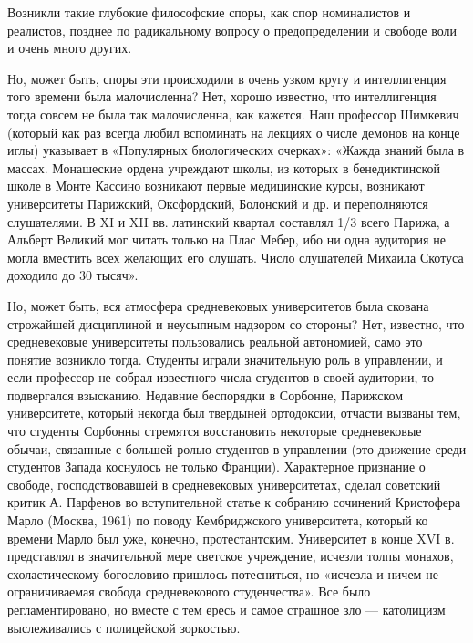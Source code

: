 Возникли такие глубокие философские споры, как спор номиналистов и
реалистов, позднее по радикальному вопросу о предопределении и свободе воли и
очень много других.

Но, может быть, споры эти происходили в очень узком кругу и интеллигенция
того времени была малочисленна? Нет, хорошо известно, что интеллигенция
тогда совсем не была так малочисленна, как кажется. Наш профессор Шимкевич
(который как раз всегда любил вспоминать на лекциях о числе демонов на
конце иглы) указывает в «Популярных биологических очерках»: «Жажда знаний
была в массах. Монашеские ордена учреждают школы, из которых в
бенедиктинской школе в Монте Кассино возникают первые медицинские курсы,
возникают университеты Парижский, Оксфордский, Болонский и др. и
переполняются слушателями. В XI и XII вв. латинский квартал составлял 1/3
всего Парижа, а Альберт Великий мог читать только на Плас Мебер, ибо ни
одна аудитория не могла вместить всех желающих его слушать. Число
слушателей Михаила Скотуса доходило до 30 тысяч».

Но, может быть, вся атмосфера средневековых университетов была скована
строжайшей дисциплиной и неусыпным надзором со стороны? Нет, известно, что
средневековые университеты пользовались реальной автономией, само это понятие
возникло тогда. Студенты играли значительную роль в управлении, и если
профессор не собрал известного числа студентов в своей аудитории, то
подвергался взысканию. Недавние беспорядки в Сорбонне, Парижском университете,
который некогда был твердыней ортодоксии, отчасти вызваны тем, что студенты
Сорбонны стремятся восстановить некоторые средневековые обычаи, связанные с
большей ролью студентов в управлении (это движение среди студентов Запада
коснулось не только Франции). Характерное признание о свободе, господствовавшей
в средневековых университетах, сделал советский критик А. Парфенов во
вступительной статье к собранию сочинений Кристофера Марло (Москва, 1961) по
поводу Кембриджского университета, который ко времени Марло был уже, конечно,
протестантским. Университет в конце XVI в. представлял в значительной мере
светское учреждение, исчезли толпы монахов, схоластическому богословию пришлось
потесниться, но «исчезла и ничем не ограничиваемая свобода средневекового
студенчества». Все было регламентировано, но вместе с тем ересь и самое
страшное зло --- католицизм выслеживались с полицейской зоркостью.

